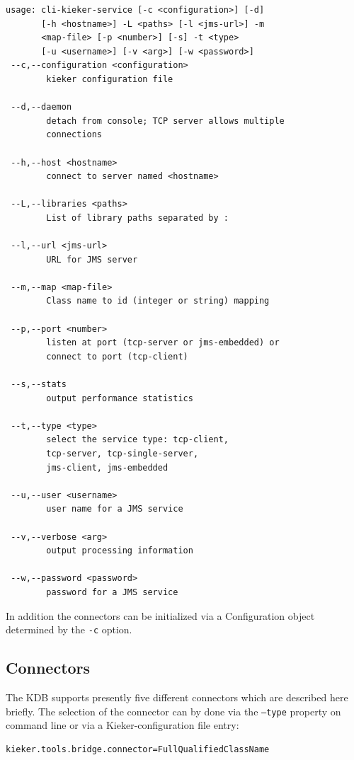 \documentclass[11pt,a4paper]{article}
\begin{document}
\begin{lstlisting}[caption=Command line options of the Kieker Data Bridge]
usage: cli-kieker-service [-c <configuration>] [-d] 
       [-h <hostname>] -L <paths> [-l <jms-url>] -m
       <map-file> [-p <number>] [-s] -t <type>
       [-u <username>] [-v <arg>] [-w <password>]
 --c,--configuration <configuration>
        kieker configuration file

 --d,--daemon
        detach from console; TCP server allows multiple 
        connections

 --h,--host <hostname>
        connect to server named <hostname>

 --L,--libraries <paths>
        List of library paths separated by :

 --l,--url <jms-url>
        URL for JMS server

 --m,--map <map-file>
        Class name to id (integer or string) mapping

 --p,--port <number>
        listen at port (tcp-server or jms-embedded) or
        connect to port (tcp-client)

 --s,--stats
        output performance statistics

 --t,--type <type>
        select the service type: tcp-client,
        tcp-server, tcp-single-server, 
        jms-client, jms-embedded

 --u,--user <username>
        user name for a JMS service

 --v,--verbose <arg>
        output processing information

 --w,--password <password>
        password for a JMS service
\end{lstlisting}

\noindent
In addition the connectors can be initialized via a Configuration object determined by the \texttt{-c} option.

%
\subsection{Connectors}

The KDB supports presently five different connectors which are described here briefly. The selection of the connector can by done via the \texttt{--type} property on command line or via a Kieker-configuration file entry:

\begin{verbatim}
kieker.tools.bridge.connector=FullQualifiedClassName
\end{verbatim}
\end{document}
